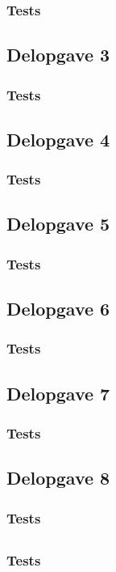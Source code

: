 \subsubsection{Tests}
\subsection{Delopgave 3}
\subsubsection{Tests}
\subsection{Delopgave 4}
\subsubsection{Tests}
\subsection{Delopgave 5}
\subsubsection{Tests}
\subsection{Delopgave 6}
\subsubsection{Tests}
\subsection{Delopgave 7}
\subsubsection{Tests}
\subsection{Delopgave 8}
\subsubsection{Tests}

\subsection{}
\subsubsection{Tests}
